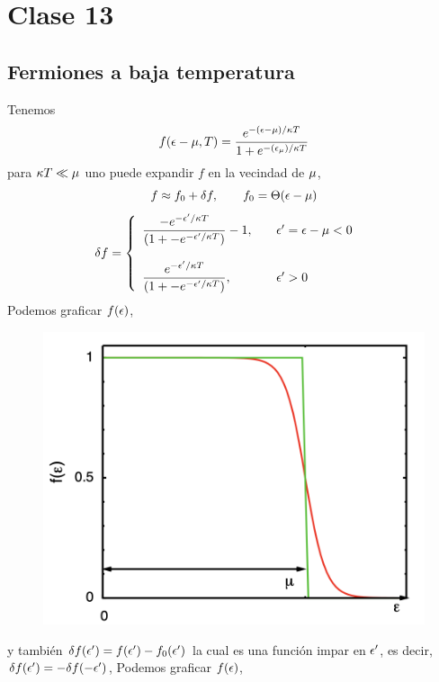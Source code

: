\section{Clase 13}
\subsection{Fermiones a baja temperatura}
Tenemos
	\begin{equation}
  f(\epsilon-\mu,T )=\frac{e^{-(\epsilon-\mu )/\kappa T}}{1+e^{-(\epsilon_\mu )/\kappa T}}
\end{equation}
para $\kappa T\ll\mu $ uno puede expandir $f$ en la vecindad de $\mu$,
\begin{equation}
  f\approx f_0+\delta f,\qquad f_0=\Theta (\epsilon-\mu )
\end{equation}
\begin{align}
  \delta f&=\left\{\begin{array}{ll}
  	\dfrac{-e^{-\epsilon'/\kappa T}}{(1+-e^{-\epsilon'/\kappa T})}-1,& \quad \epsilon'=\epsilon-\mu <0\\ \\
  	\dfrac{e^{-\epsilon'/\kappa T}}{(1+-e^{-\epsilon'/\kappa T})},&\quad \epsilon'>0
  \end{array}\right.
\end{align}
Podemos graficar $f(\epsilon)$,
\begin{figure}[h!]
	\centering
	\includegraphics[scale=0.5]{fig/im1.png}
\end{figure}
y también $\delta f(\epsilon')=f(\epsilon')-f_0(\epsilon')$ la cual es una función impar en $\epsilon'$, es decir, $\delta f(\epsilon')=-\delta f(-\epsilon')$,
Podemos graficar $f(\epsilon)$,
